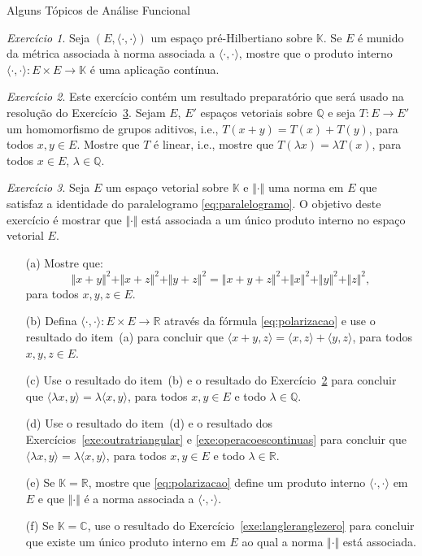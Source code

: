 \documentclass[oneside,final,11pt]{amsbook}
\newcommand{\R}{\mathds R}
\newcommand{\C}{\mathds C}
\newcommand{\Q}{\mathds Q}
\newcommand{\K}{\mathds K}
\theoremstyle{remark}\newtheorem{exercise}{Exercício}[chapter]
\theoremstyle{remark}\newtheorem{*exercise}[exercise]{\hbox to 0pt{\hskip 0pt minus 1fil*}Exercício}
\theoremstyle{definition}\newtheorem{exdefin}{Definição}[chapter]
\theoremstyle{plain}\newtheorem{teo}{Teorema}[section]
\theoremstyle{plain}\newtheorem{lem}[teo]{Lema}
\theoremstyle{plain}\newtheorem{prop}[teo]{Proposição}
\theoremstyle{plain}\newtheorem{cor}[teo]{Corolário}
\theoremstyle{definition}\newtheorem{defin}[teo]{Definição}
\theoremstyle{remark}\newtheorem{rem}[teo]{Observação}
\theoremstyle{definition}\newtheorem{notation}[teo]{Notação}
\theoremstyle{definition}\newtheorem{convention}[teo]{Convenção}
\theoremstyle{definition}\newtheorem{example}[teo]{Exemplo}
\numberwithin{section}{chapter}
\numberwithin{equation}{section}
\begin{document}
\begin{chapter}{Alguns Tópicos de Análise Funcional}
\begin{exercise}
Seja $(E,\langle\cdot,\cdot\rangle)$ um espaço pré-Hilbertiano sobre $\K$. Se $E$ é munido da métrica associada
à norma associada a $\langle\cdot,\cdot\rangle$, mostre que o produto interno $\langle\cdot,\cdot\rangle:E\times E\to\K$
é uma aplicação contínua.
\end{exercise}

\begin{exercise}\label{exe:Qlinear}
Este exercício contém um resultado preparatório que será usado na resolução do Exercício~\ref{exe:critparalelogramo}.
Sejam $E$, $E'$ espaços vetoriais sobre $\Q$ e seja $T:E\to E'$ um homomorfismo de grupos aditivos, i.e.,
$T(x+y)=T(x)+T(y)$, para todos $x,y\in E$. Mostre que $T$ é linear, i.e., mostre que $T(\lambda x)=\lambda T(x)$,
para todos $x\in E$, $\lambda\in\Q$.
\end{exercise}

\begin{exercise}\label{exe:critparalelogramo}
Seja $E$ um espaço vetorial sobre $\K$ e $\Vert\cdot\Vert$ uma norma em $E$ que satisfaz a identidade do paralelogramo
\eqref{eq:paralelogramo}. O objetivo deste exercício é mostrar que $\Vert\cdot\Vert$ está associada a um único
produto interno no espaço vetorial $E$.
\begin{itemize}
\item[(a)] Mostre que:
\[\Vert x+y\Vert^2+\Vert x+z\Vert^2+\Vert y+z\Vert^2=\Vert x+y+z\Vert^2+\Vert x\Vert^2+\Vert y\Vert^2+\Vert z\Vert^2,\]
para todos $x,y,z\in E$.
\item[(b)] Defina $\langle\cdot,\cdot\rangle:E\times E\to\R$ através da fórmula \eqref{eq:polarizacao}
e use o resultado do item~(a) para concluir que $\langle x+y,z\rangle=\langle x,z\rangle+\langle y,z\rangle$,
para todos $x,y,z\in E$.
\item[(c)] Use o resultado do item~(b) e o resultado do Exercício~\ref{exe:Qlinear} para concluir que
$\langle\lambda x,y\rangle=\lambda\langle x,y\rangle$, para todos $x,y\in E$ e todo $\lambda\in\Q$.
\item[(d)] Use o resultado do item~(d) e o resultado dos Exercícios~\ref{exe:outratriangular} e
\ref{exe:operacoescontinuas} para concluir que
$\langle\lambda x,y\rangle=\lambda\langle x,y\rangle$, para todos $x,y\in E$ e todo $\lambda\in\R$.
\item[(e)] Se $\K=\R$, mostre que \eqref{eq:polarizacao} define um produto interno $\langle\cdot,\cdot\rangle$
em $E$ e que $\Vert\cdot\Vert$ é a norma associada a $\langle\cdot,\cdot\rangle$.
\item[(f)] Se $\K=\C$, use o resultado do Exercício~\ref{exe:langleranglezero} para concluir que existe
um único produto interno em $E$ ao qual a norma $\Vert\cdot\Vert$ está associada.
\end{itemize}
\end{exercise}


\end{chapter}
\end{document}
